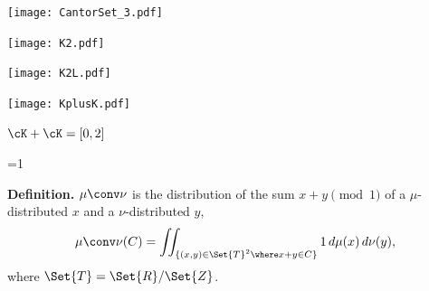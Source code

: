 \begin{frame}
\begin{center}

\texttt{[image: CantorSet\_3.pdf]}

\end{center}
\end{frame}


\begin{frame}
\begin{center}

\texttt{[image: K2.pdf]}

\end{center}
\end{frame}


\begin{frame}
\begin{center}

\texttt{[image: K2L.pdf]}

\end{center}
\end{frame}


\begin{frame}
\begin{center}


\bigskip

\texttt{[image: KplusK.pdf]}

$\cK+\cK = [0,2]$

\end{center}
\end{frame}


=1
\begin{frame}

{\bf Definition.} 
$\mu \conv \nu$ is the distribution of the sum $x+y \pmod{1}$ 
of a $\mu$-distributed $x$ and a $\nu$-distributed $y$,
$$
  \mu \conv \nu(C) = \iint_{\{(x,y)\in\Set{T}^2 \where x+y \in C\}} 1 \,d\mu(x) \,d\nu(y), 
$$
where $\Set{T} = \Set{R}/\Set{Z}$. 

\bigskip
{}

\end{frame}
\fi


